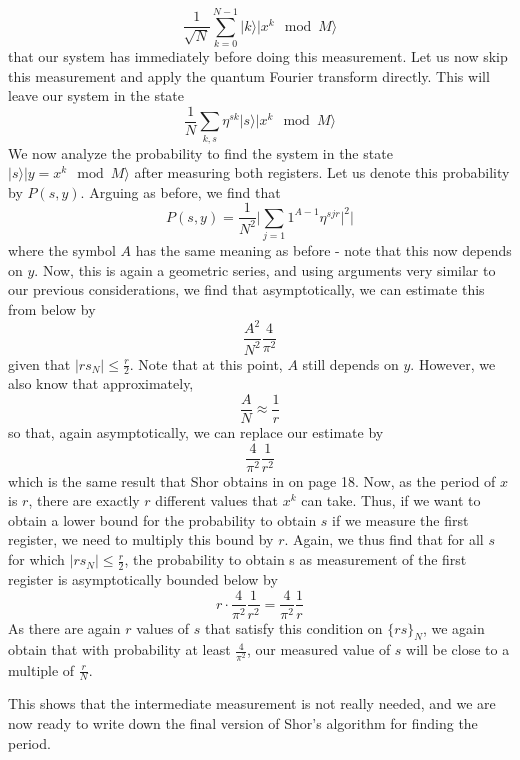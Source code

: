 \documentclass[a4paper, draft]{article}
\theoremstyle{own}
\theoremstyle{remark}
\begin{document}
$$
\frac{1}{\sqrt{N}} \sum_{k=0}^{N-1} |k \rangle |x^k \mod M \rangle
$$
that our system has immediately before doing this measurement. Let us now skip this measurement and apply the quantum Fourier transform directly. This will leave our system in the state
$$
\frac{1}{N} \sum_{k,s} \eta^{sk} |s\rangle |x^k \mod M \rangle
$$
We now analyze the probability to find the system in the state $|s\rangle |y = x^k \mod M \rangle$ after measuring both registers. Let us denote this probability by $P(s,y)$. Arguing as before, we find that
$$
P(s,y) = \frac{1}{N^2} \big| \sum_{j=1}1^{A-1} \eta^{sjr} \big|^2\big|
$$
where the symbol $A$ has the same meaning as before - note that this now depends on $y$. Now, this is again a geometric series, and using arguments very similar to our previous considerations, we find that asymptotically, we can estimate this from below by
$$
\frac{A^2}{N^2} \frac{4}{\pi^2}
$$
given that $|{rs}_N| \leq \frac{r}{2}$. 
Note that at this point, $A$ still depends on $y$. However, we also know that approximately,
$$
\frac{A}{N} \approx  \frac{1}{r}
$$
so that, again asymptotically, we can replace our estimate by
$$
\frac{4}{\pi^2} \frac{1}{r^2}
$$
which is the same result that Shor obtains in \cite{Shor96} on page 18. Now, as the period of $x$ is $r$, there are exactly $r$ different values that $x^k$ can take. Thus, if we want to obtain a lower bound for the probability to obtain $s$ if we measure the first register, we need to multiply this bound by $r$. Again, we thus find that for all $s$ for which $|{rs}_N| \leq \frac{r}{2}$, the probability to obtain s as measurement of the first register is asymptotically bounded below by 
$$
r \cdot\frac{4}{\pi^2} \frac{1}{r^2} = \frac{4}{\pi^2} \frac{1}{r}
$$
As there are again $r$ values of $s$ that satisfy this condition on $\{rs\}_N$, we again obtain that with probability at least $\frac{4}{\pi^2}$, our measured value of $s$ will be close to a multiple of $\frac{r}{N}$. 

This shows that the intermediate measurement is not really needed, and we are now ready to write down the final version of Shor's algorithm for finding the period.
\end{document}
